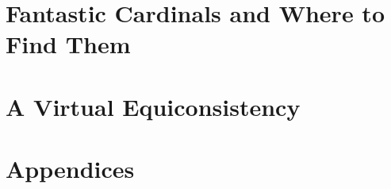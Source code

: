 




\frontmatter





\setcounter{tocdepth}{2}
\tableofcontents
\thispagestyle{fancy}






\mainmatter

\newpage\part{Fantastic Cardinals and Where to Find Them}





\newpage\part{A Virtual Equiconsistency}









\newpage\part{Appendices}
\appendix





\backmatter
\pagestyle{fancy}

\nocite{*}



